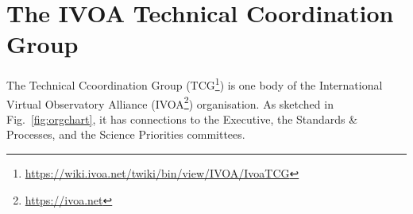 \documentclass[11pt,twoside]{article}
\begin{document}
\begin{abstract}
In recent years the Technical Coordination Group (TCG) of the International Virtual Observatory Alliance (IVOA) has
continued the activities of developing community open standards targeted at establishing an interoperable scenario in the
general astrophysical research domain.
Alongside the continuous work of revising or defining standards, activity has focused on requirements from research sub-
domains that are re-emerging or have previously received less attention (such as time-domain astronomy or high-energy
astrophysics), on technical challenges arising from new information system technologies (like OpenAPI), and on new data
formats and distribution paradigms (including increased use of tessellation and distributed solutions). The TCG has also
discussed organisational aspects, possible improvements, and challenges of the IVOA standardisation process itself.
This contribution provides a brief overview of all of the above and tries to identify the major priorities that the TCG might
have to face in the oncoming years, balancing the available efforts volunteered by member projects and participating
projects against the requirements for new or renewed standards and their uptake.
\end{abstract}



\section{The IVOA Technical Coordination Group}

The Technical Ccoordination Group (TCG\footnote{\url{https://wiki.ivoa.net/twiki/bin/view/IVOA/IvoaTCG}})
is one body of the International Virtual Observatory Alliance (IVOA\footnote{\url{https://ivoa.net}}) organisation.
As sketched in Fig.~\ref{fig:orgchart}, it has connections to the Executive, the Standards \& Processes,
and the Science Priorities committees.
\end{document}
